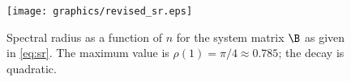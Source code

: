 \begin{figure}
   \centering
   \texttt{[image: graphics/revised\_sr.eps]}  \\
   \caption{Spectral radius as a function of $n$ for the system matrix $\B$ as given in \eqref{eq:sr}. The maximum value is $\rho(1) = \pi/4\approx0.785$; the decay is quadratic.}
   \label{fig:spectral radius}
\end{figure}

\endinput  %